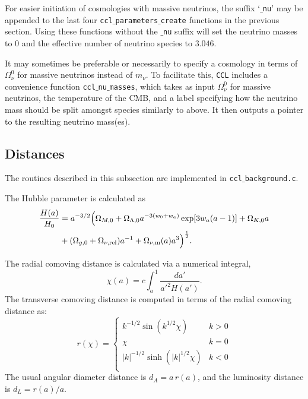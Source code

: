 \documentclass[\docopts]{\docclass}
\newcommand{\ccl}{{\tt CCL}\xspace}
\begin{document}
For easier initiation of cosmologies with massive neutrinos, the suffix `{\tt $\_$nu}' may be appended to the last four {\tt ccl$\_$parameters$\_$create} functions in the previous section. Using these functions without the {\tt $\_$nu} suffix will set the neutrino masses to 0 and the effective number of neutrino species to $3.046$.

It may sometimes be preferable or necessarily to specify a cosmology in terms of $\Omega_\nu^0$ for massive neutrinos instead of $m_\nu$. To facilitate this, \ccl includes a convenience function {\tt ccl$\_$nu$\_$masses}, which takes as input $\Omega_\nu^0$ for massive neutrinos, the temperature of the CMB, and a label specifying how the neutrino mass should be split amongst species similarly to above. It then outputs a pointer to the resulting neutrino mass(es).


\subsection{Distances}
\label{sec:distances}

The routines described in this subsection are implemented in {\tt ccl$\_$background.c}.

The Hubble parameter is calculated as
%
\begin{align}\label{eq:Ha}
\frac{H(a)}{H_0} &= a^{-3/2}\Big(\Omega_{M,0}+\Omega_{\Lambda,0} a^{-3(w_0+w_a)}
    \exp[3 w_a (a-1)]+\Omega_{K,0} a \nonumber \\ &+(\Omega_{g,0} + \Omega_{\nu, {\rm rel}}) a^{-1} + \Omega_{\nu, {\rm m}}(a)a^3\Big)^{\frac{1}{2}}.
\end{align}

The radial comoving distance is calculated via a numerical integral,
\begin{equation}
 \chi(a)= c \int_a^1 \frac{da'}{a'^2 H(a')}.
\end{equation}
The transverse comoving distance is computed in terms of the radial comoving distance as:
\begin{equation}\label{eq:angdist}
 r(\chi)=\left\{\begin{array}{cc}
                 k^{-1/2}\sin(k^{1/2}\chi) & k>0\\
                 \chi & k=0\\
                 |k|^{-1/2}\sinh(|k|^{1/2}\chi) & k<0\\
                \end{array}\right.
\end{equation}
The usual angular diameter distance is $d_A=a\,r(a)$, and the luminosity distance is
$d_L=r(a)/a$.
\end{document}
